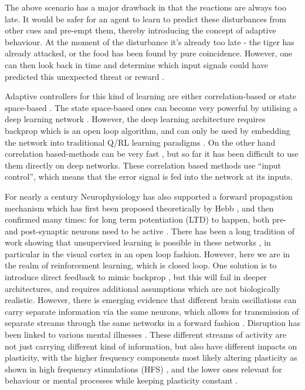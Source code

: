 \documentclass{aamas2018}
\begin{document}
The above scenario has a major drawback in that the reactions are
always too late. It would be safer for an agent to learn to predict
these disturbances from other cues and pre-empt them, thereby
introducing the concept of adaptive behaviour. At the moment of the
disturbance it's already too late - the tiger has already attacked, or
the food has been found by pure coincidence. However, one can then
look back in time and determine which input signals could have
predicted this unexpected threat or reward
\cite{Sutton87,Sutton98,Abbott01,NIPS2002_2245,PorrNecoInvco2003}.

Adaptive controllers for this kind of learning are either
correlation-based \cite{Klopf86,PorrNecoISO2003,Verschure91} or state
space-based \cite{Dayan1992,Sutton98}. The state space-based ones can
become very powerful by utilising a deep learning network
\cite{Guo2014}. However, the deep learning architecture requires backprop which
is an open loop algorithm, and can only be used by embedding the
network into traditional Q/RL learning
paradigms \cite{Dayan1992,Guo2014}. On the other hand correlation
based-methods can be very fast \cite{Porr2006ICO}, but so far it has
been difficult to use them directly on deep networks. These
correlation based methods use ``input control'', which means that the
error signal is fed into the network at its inputs.

For nearly a century Neurophysiology has also supported a forward
propagation mechanism which has first been proposed theoretically by
Hebb \cite{Hebb49}, and then confirmed many times: for long term
potentiation (LTD) to happen, both pre- and post-synaptic neurons need
to be active \cite{Luescher2012}.  There has been a long tradition of
work showing that unsupervised learning is possible in these networks
\cite{Linsker88}, in particular in the visual cortex \cite{Miller00}
in an open loop fashion. However, here we are in the realm of
reinforcement learning, which is closed loop. One solution is to
introduce direct feedback to mimic backprop \cite{Lillicrap2016}, but
this will fail in deeper architectures, and requires additional
assumptions which are not biologically realistic.  However, there is
emerging evidence that different brain oscillations can carry separate
information via the same neurons, which allows for transmission of separate
streams through the same networks in a forward fashion
\cite{Mizuhara2007,Canolty2010}. Disruption has been linked to
various mental illnesses \cite{Kim2016,Won2017}. These different
streams of activity are not just carrying different kind of
information, but also have different impacts on plasticity, with the
higher frequency components most likely altering plasticity as shown
in high frequency stimulations (HFS) \cite{Bliss73}, and the lower
ones relevant for behaviour or mental processes while keeping
plasticity constant \cite{Mizuhara2007}.
\end{document}
